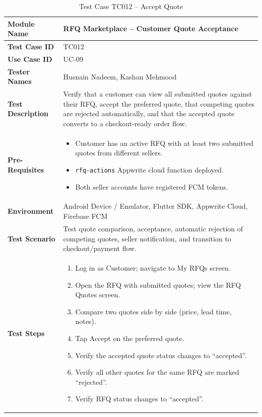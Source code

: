 \begin{table}[H]
\centering
\caption{Test Case TC012 -- Accept Quote}
\label{tab:tc012}
\renewcommand{\arraystretch}{1.15}
\small
\begin{tabular}{|p{3.2cm}|p{10.8cm}|}
\hline
\textbf{Module Name} & RFQ Marketplace -- Customer Quote Acceptance \\ \hline
\textbf{Test Case ID} & TC012 \\ \hline
\textbf{Use Case ID} & UC-09 \\ \hline
\textbf{Tester Names} & Husnain Nadeem, Kashan Mehmood \\ \hline
\textbf{Test Description} & Verify that a customer can view all submitted quotes against their RFQ, accept the preferred quote, that competing quotes are rejected automatically, and that the accepted quote converts to a checkout-ready order flow. \\ \hline
\textbf{Pre-Requisites} &
\begin{itemize}[leftmargin=*,noitemsep]
\item Customer has an active RFQ with at least two submitted quotes from different sellers.
\item \texttt{rfq-actions} Appwrite cloud function deployed.
\item Both seller accounts have registered FCM tokens.
\end{itemize} \\ \hline
\textbf{Environment} & Android Device / Emulator, Flutter SDK, Appwrite Cloud, Firebase FCM \\ \hline
\textbf{Test Scenario} & Test quote comparison, acceptance, automatic rejection of competing quotes, seller notification, and transition to checkout/payment flow. \\ \hline
\textbf{Test Steps} &
\begin{enumerate}[leftmargin=*,noitemsep]
\item Log in as Customer; navigate to My RFQs screen.
\item Open the RFQ with submitted quotes; view the RFQ Quotes screen.
\item Compare two quotes side by side (price, lead time, notes).
\item Tap Accept on the preferred quote.
\item Verify the accepted quote status changes to ``accepted''.
\item Verify all other quotes for the same RFQ are marked ``rejected''.
\item Verify RFQ status changes to ``accepted''.

\end{enumerate}
\end{tabular}
\end{table}
